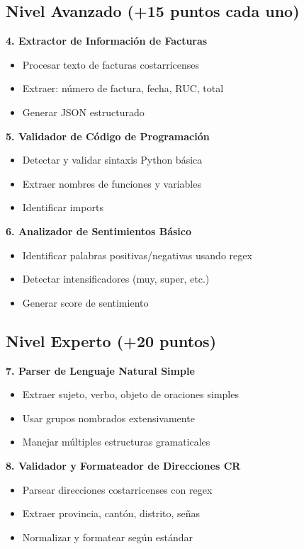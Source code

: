 \documentclass[11pt,letterpaper]{article}
\begin{document}
\subsection{Nivel Avanzado (+15 puntos cada uno)}

\textbf{4. Extractor de Información de Facturas}
\begin{itemize}
    \item Procesar texto de facturas costarricenses
    \item Extraer: número de factura, fecha, RUC, total
    \item Generar JSON estructurado
\end{itemize}

\textbf{5. Validador de Código de Programación}
\begin{itemize}
    \item Detectar y validar sintaxis Python básica
    \item Extraer nombres de funciones y variables
    \item Identificar imports
\end{itemize}

\textbf{6. Analizador de Sentimientos Básico}
\begin{itemize}
    \item Identificar palabras positivas/negativas usando regex
    \item Detectar intensificadores (muy, super, etc.)
    \item Generar score de sentimiento
\end{itemize}

\subsection{Nivel Experto (+20 puntos)}

\textbf{7. Parser de Lenguaje Natural Simple}
\begin{itemize}
    \item Extraer sujeto, verbo, objeto de oraciones simples
    \item Usar grupos nombrados extensivamente
    \item Manejar múltiples estructuras gramaticales
\end{itemize}

\textbf{8. Validador y Formateador de Direcciones CR}
\begin{itemize}
    \item Parsear direcciones costarricenses con regex
    \item Extraer provincia, cantón, distrito, señas
    \item Normalizar y formatear según estándar
\end{itemize}
\end{document}
